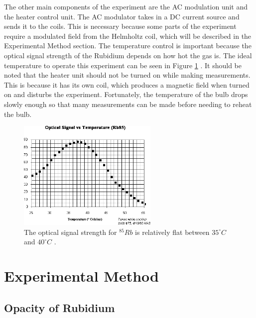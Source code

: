 \documentclass[11pt,letterpaper]{article}
\begin{document}
The other main components of the experiment are the AC modulation unit and the
heater control unit. The AC modulator takes in a DC current source and sends it
to the coils. This is necessary because some parts of the experiment require a
modulated field from the Helmholtz coil, which will be described in the
Experimental Method section. The temperature control is important because the
optical signal strength of the Rubidium depends on how hot the gas is. The ideal
temperature to operate this experiment can be seen in Figure \ref{tempcalib}
\cite{LabManua}. It should be noted that the heater unit should not be turned on
while making measurements. This is because it has its own coil, which produces a
magnetic field when turned on and disturbs the experiment. Fortunately, the
temperature of the bulb drops slowly enough so that many measurements can be
made before needing to reheat the bulb.

\begin{figure}
    \centering
    \includegraphics[width=0.6\textwidth]{figures/OPTimage006.png}
    \caption{The optical signal strength for $^{85}Rb$ is relatively flat
    between $35^\circ C$ and $40^\circ C$ \cite{LabManual}.}
    \label{tempcalib}
\end{figure}

\section{Experimental Method}

\subsection{Opacity of Rubidium}
\end{document}
